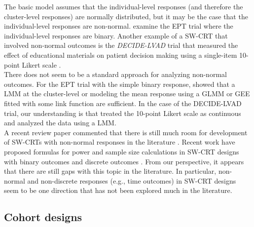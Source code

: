 \documentclass[10pt]{article}
\begin{document}
The basic model assumes that the individual-level responses (and therefore the cluster-level responses) are normally distributed, but it may be the case that the individual-level responses are non-normal. \citeauthor{Hussey:2007} examine the EPT trial where the individual-level responses are binary. Another example of a SW-CRT that involved non-normal outcomes is the \textit{DECIDE-LVAD} trial that measured the effect of educational materials on patient decision making using a single-item 10-point Likert scale \parencite{Allen:2018}.
\\

There does not seem to be a standard approach for analyzing non-normal outcomes. For the EPT trial with the simple binary response, \citeauthor{Hussey:2007} showed that a LMM at the cluster-level or modeling the mean response using a GLMM or GEE fitted with some link function are sufficient. In the case of the DECIDE-LVAD trial, our understanding is that \citeauthor{Allen:2018} treated the 10-point Likert scale as continuous and analyzed the data using a LMM.
\\

A recent review paper commented that there is still much room for development of SW-CRTs with non-normal responses in the literature \parencite{Li:2021}. Recent work have proposed formulas for power and sample size calculations in SW-CRT designs with binary outcomes \parencite{Wang:2021} and discrete outcomes \parencite{Xia:2021}. From our perspective, it appears that there are still gaps with this topic in the literature. In particular, non-normal and non-discrete responses (e.g., time outcomes) in SW-CRT designs seem to be one direction that has not been explored much in the literature.

\subsection{Cohort designs}
\end{document}
